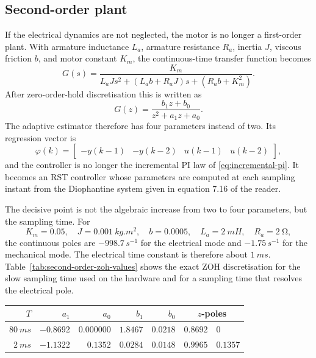 \subsection{Second-order plant}

If the electrical dynamics are not neglected, the motor is no longer a
first-order plant. With armature inductance \(L_a\), armature resistance
\(R_a\), inertia \(J\), viscous friction \(b\), and motor constant \(K_m\), the
continuous-time transfer function becomes
\begin{equation}
  G(s)=
  \frac{K_m}
       {L_aJs^2+\left(L_ab+R_aJ\right)s+\left(R_ab+K_m^2\right)} .
  \label{eq:second-order-continuous-transfer}
\end{equation}
After zero-order-hold discretisation this is written as
\begin{equation}
  G(z)=\frac{b_1z+b_0}{z^2+a_1z+a_0}.
  \label{eq:second-order-discrete-transfer}
\end{equation}
The adaptive estimator therefore has four parameters instead of two. Its
regression vector is
\begin{equation}
  \varphi(k)=
  \begin{bmatrix}
    -y(k-1) & -y(k-2) & u(k-1) & u(k-2)
  \end{bmatrix},
  \label{eq:second-order-regressor}
\end{equation}
and the controller is no longer the incremental PI law of
\eqref{eq:incremental-pi}. It becomes an RST controller whose parameters are
computed at each sampling instant from the Diophantine system given in
equation 7.16 of the reader.

The decisive point is not the algebraic increase from two to four parameters,
but the sampling time. For
\[
  K_m=0.05,\quad
  J=\SI{0.001}{kg.m^2},\quad
  b=0.0005,\quad
  L_a=\SI{2}{mH},\quad
  R_a=\SI{2}{\ohm},
\]
the continuous poles are \(-998.7\,\si{s^{-1}}\) for the electrical mode and
\(-1.75\,\si{s^{-1}}\) for the mechanical mode. The electrical time constant
is therefore about \(\SI{1}{ms}\). Table~\ref{tab:second-order-zoh-values}
shows the exact ZOH discretisation for the slow sampling time used on the
hardware and for a sampling time that resolves the electrical pole.

\begin{scripttable}
  \centering
  \caption{Exact ZOH parameters of the second-order motor model.}
  \label{tab:second-order-zoh-values}
  \begin{tabular}{rrrrrrl}
    \toprule
    \(T\) & \(a_1\) & \(a_0\) & \(b_1\) & \(b_0\) & \multicolumn{2}{c}{\(z\)-poles} \\
    \midrule
    \(\SI{80}{ms}\) & \(-0.8692\) & \(0.000000\) & \(1.8467\) & \(0.0218\) & \(0.8692\) & \(0\) \\
    \(\SI{2}{ms}\)  & \(-1.1322\) & \(0.1352\)   & \(0.0284\) & \(0.0148\) & \(0.9965\) & \(0.1357\) \\
    \bottomrule
  \end{tabular}
\end{scripttable}

